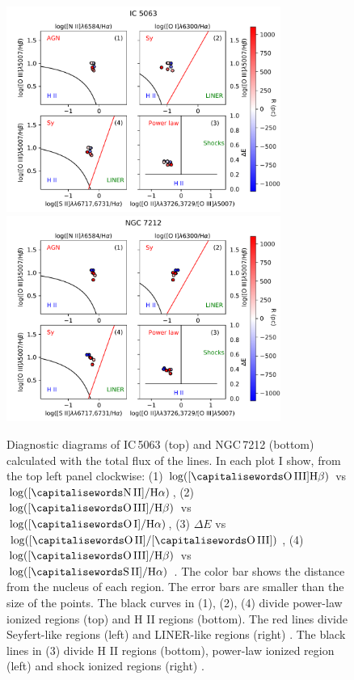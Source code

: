 \documentclass[../main.tex]{subfiles}
\begin{document}
\begin{figure} 
\centering
\includegraphics[width=0.8\textwidth]{images/paper1/IC5063_diag.pdf}\\
\includegraphics[width=0.8\textwidth]{images/paper1/NGC7212_diag.pdf}\\
\caption[]{Diagnostic diagrams of IC\,5063 (top) and NGC\,7212 (bottom) calculated with the total flux of the lines.  In each plot I show, from the top left panel clockwise: (1) $\log([\rm\ion{O}{III}] \Hb)$ vs $\log([\rm\ion{N}{II}]/ \Ha)$, (2) $\log([\rm\ion{O}{III}]/ \Hb)$ vs $\log([\rm\ion{O}{I}]/ \Ha)$, (3) $\Delta E$ vs $\log([\rm\ion{O}{II}]/[\rm\ion{O}{III}])$, (4) $\log([\rm\ion{O}{III}]/ \Hb)$ vs $\log([\rm\ion{S}{II}]/ \Ha)$ \citep{Baldwin81, Veilleux87}. The color bar shows the distance from the nucleus of each region.
The error bars are smaller than the size of the points. The black curves in (1), (2), (4) divide power-law ionized regions (top) and H II regions (bottom). The red lines divide Seyfert-like regions (left) and LINER-like regions (right) \citep{Kewley06}. The black lines in (3) divide H II regions (bottom), power-law ionized region (left) and shock ionized regions (right) \citep{Baldwin81}.  }
\label{fig:diag_estot}
\end{figure}
\end{document}
